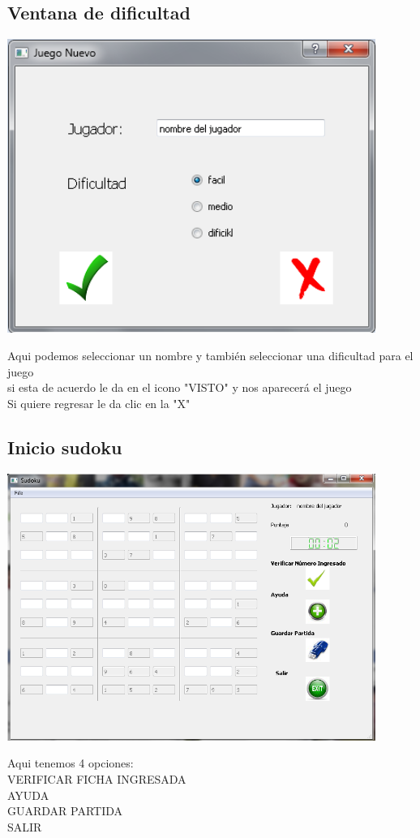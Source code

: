 \documentclass[12pt]{extbook}
\begin{document}
\begin{center}
\section{Ventana de dificultad}
\end{center}
\begin{center}
\includegraphics[width=12cm]{nombre_jug1.png}
\end{center}
Aqui podemos seleccionar un  nombre y también seleccionar una dificultad para el juego\\
si esta de acuerdo le da en el icono "VISTO" y nos aparecerá el juego \\
Si quiere regresar le da clic en la "X" \\


\begin{center}
\section{Inicio sudoku}
\end{center}
\begin{center}
\includegraphics[width=12cm]{sudoku_ini1.png}
\end{center}
Aqui tenemos 4 opciones:\\
VERIFICAR FICHA INGRESADA\\
AYUDA\\
GUARDAR PARTIDA\\
SALIR\\
\end{document}
